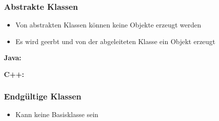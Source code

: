 {
\begin{frame}
	\frametitle{Abstrakte Klassen}
	\begin{itemize}
		\item Von abstrakten Klassen können keine Objekte erzeugt werden
		\item Es wird geerbt und von der abgeleiteten Klasse ein Objekt erzeugt
	\end{itemize}
	
	{\scriptsize\bfseries Java:}
		{\tiny\UseRawInputEncoding{}}
	
	{\scriptsize\bfseries C++:}
		{\tiny\UseRawInputEncoding{}}
		
		
		{\tiny\UseRawInputEncoding{}}
\end{frame}
}

{
\begin{frame}
	\frametitle{Endgültige Klassen}
	\begin{itemize}
		\item Kann keine Basisklasse sein
	\end{itemize}
	
	{\tiny\UseRawInputEncoding{}}
	{\tiny\UseRawInputEncoding{}}
\end{frame}
}
